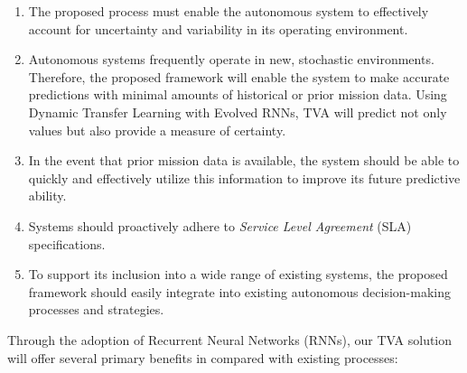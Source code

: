 \documentclass{article}
\begin{document}
\begin{enumerate}[noitemsep]

  \item The proposed process must enable the autonomous system to effectively account for uncertainty and variability in its operating environment. 

  \item Autonomous systems frequently operate in new, stochastic environments. Therefore, the proposed framework will enable the system to make accurate predictions with minimal amounts of historical or prior mission data. Using Dynamic Transfer Learning with Evolved RNNs, TVA will predict not only values but also provide a measure of certainty. %

  \item In the event that prior mission data is available, the system should be able to quickly and effectively utilize this information to improve its future predictive ability.



  \item Systems should proactively adhere to \emph{Service Level Agreement} (SLA) specifications.

  \item To support its inclusion into a wide range of existing systems, the proposed framework should easily integrate into existing autonomous decision-making processes and strategies.%

\end{enumerate}




Through the adoption of Recurrent Neural Networks (RNNs), our TVA solution will offer several primary benefits in compared with existing processes:



\end{document}
